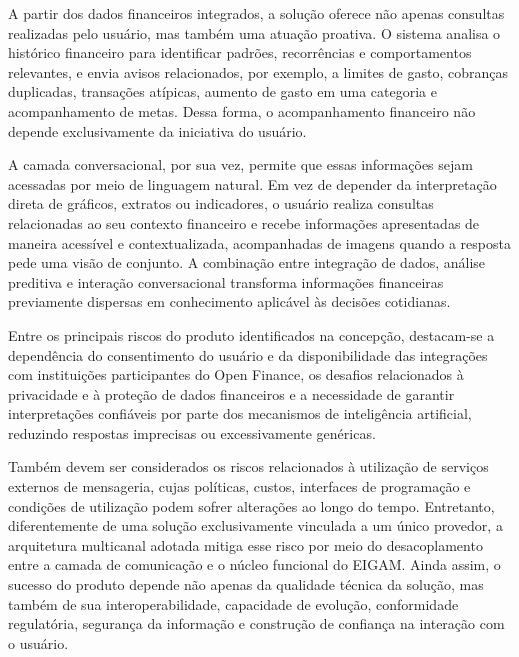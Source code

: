 A partir dos dados financeiros integrados, a solução oferece não apenas consultas realizadas pelo usuário, mas também uma atuação proativa. O sistema analisa o histórico financeiro para identificar padrões, recorrências e comportamentos relevantes, e envia avisos relacionados, por exemplo, a limites de gasto, cobranças duplicadas, transações atípicas, aumento de gasto em uma categoria e acompanhamento de metas. Dessa forma, o acompanhamento financeiro não depende exclusivamente da iniciativa do usuário.

A camada conversacional, por sua vez, permite que essas informações sejam acessadas por meio de linguagem natural. Em vez de depender da interpretação direta de gráficos, extratos ou indicadores, o usuário realiza consultas relacionadas ao seu contexto financeiro e recebe informações apresentadas de maneira acessível e contextualizada, acompanhadas de imagens quando a resposta pede uma visão de conjunto. A combinação entre integração de dados, análise preditiva e interação conversacional transforma informações financeiras previamente dispersas em conhecimento aplicável às decisões cotidianas.

Entre os principais riscos do produto identificados na concepção, destacam-se a dependência do consentimento do usuário e da disponibilidade das integrações com instituições participantes do Open Finance, os desafios relacionados à privacidade e à proteção de dados financeiros e a necessidade de garantir interpretações confiáveis por parte dos mecanismos de inteligência artificial, reduzindo respostas imprecisas ou excessivamente genéricas.

Também devem ser considerados os riscos relacionados à utilização de serviços externos de mensageria, cujas políticas, custos, interfaces de programação e condições de utilização podem sofrer alterações ao longo do tempo. Entretanto, diferentemente de uma solução exclusivamente vinculada a um único provedor, a arquitetura multicanal adotada mitiga esse risco por meio do desacoplamento entre a camada de comunicação e o núcleo funcional do EIGAM. Ainda assim, o sucesso do produto depende não apenas da qualidade técnica da solução, mas também de sua interoperabilidade, capacidade de evolução, conformidade regulatória, segurança da informação e construção de confiança na interação com o usuário.

